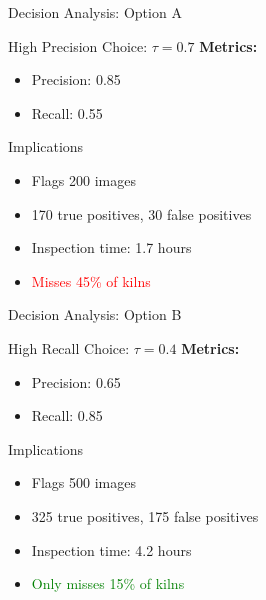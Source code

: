 \documentclass{beamer}
\begin{document}
\begin{frame}{Decision Analysis: Option A}
\begin{block}{High Precision Choice: $\tau = 0.7$}
\textbf{Metrics:}
\begin{itemize}
    \item Precision: 0.85
    \item Recall: 0.55
\end{itemize}
\end{block}

\vspace{0.15cm}

\begin{examplebox}{Implications}
\small
\begin{itemize}
    \item Flags 200 images
    \item 170 true positives, 30 false positives
    \item Inspection time: 1.7 hours
    \item \textcolor{red}{Misses 45\% of kilns}
\end{itemize}
\end{examplebox}
\end{frame}

\begin{frame}{Decision Analysis: Option B}
\begin{block}{High Recall Choice: $\tau = 0.4$}
\textbf{Metrics:}
\begin{itemize}
    \item Precision: 0.65
    \item Recall: 0.85
\end{itemize}
\end{block}

\vspace{0.15cm}

\begin{examplebox}{Implications}
\small
\begin{itemize}
    \item Flags 500 images
    \item 325 true positives, 175 false positives
    \item Inspection time: 4.2 hours
    \item \textcolor{green}{Only misses 15\% of kilns}
\end{itemize}
\end{examplebox}
\end{frame}
\end{document}
